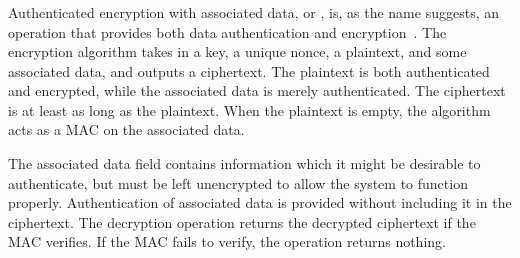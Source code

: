 {\subsubsection{\mAead{}}
Authenticated encryption with associated data, or \mAead{}, {is, as the name suggests, an operation that provides
both data authentication and encryption}~\cite{aead}. The {encryption} algorithm takes in a
key, a unique nonce, a plaintext, and some associated data, and outputs a
ciphertext. The plaintext is both authenticated and encrypted, while the
associated data is merely authenticated. The ciphertext is at least as long as
the plaintext. When the plaintext is empty, the \mAead{} 
algorithm acts as a MAC on the associated data.

The associated data {field contains} information {which it might be desirable to authenticate, but} must be left unencrypted to allow the system to function properly.%
Authentication {of associated data} is provided without {including it in the ciphertext.} {The \mAead{} decryption operation returns the decrypted ciphertext if   the MAC verifies. If the MAC fails to verify, the operation returns
nothing.}

}

